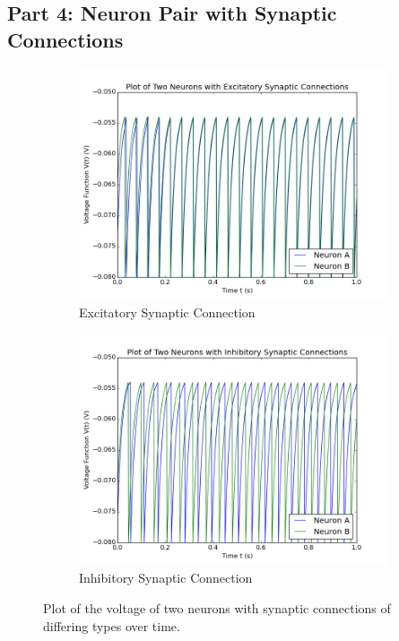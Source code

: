 \documentclass[a4paper, 10pt]{article}
\begin{document}
\subsection*{Part 4: Neuron Pair with Synaptic Connections}
\begin{figure}[H]
  \centering
  \begin{subfigure}{.5\textwidth}
    \centering
    \includegraphics[scale=0.4]{p4_Excitatory.png}
    \caption{Excitatory Synaptic Connection}
    \label{fig:sub1}
  \end{subfigure}%
  \begin{subfigure}{.5\textwidth}
    \centering
    \includegraphics[scale=0.4]{p4_Inhibitory.png}
    \caption{Inhibitory Synaptic Connection}
    \label{fig:sub2}
  \end{subfigure}
  \par\medskip
  \caption{Plot of the voltage of two neurons with synaptic connections of differing types over time.}
\end{figure}
\end{document}
